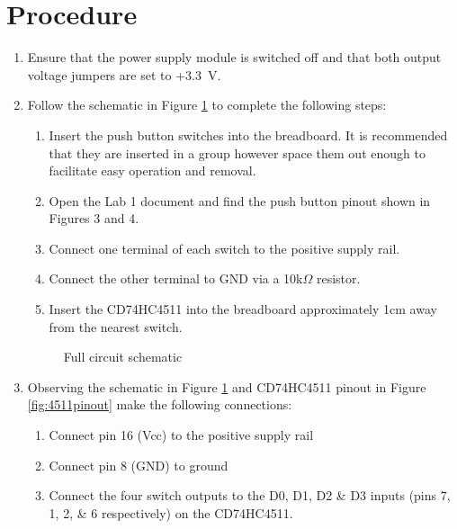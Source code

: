 \documentclass{UoNMCHA}
\numberwithin{equation}{section}
\begin{document}
\section{Procedure}
\begin{enumerate}
    \item Ensure that the power supply module is switched off and that both output voltage jumpers are set to +3.3~V.
    \item Follow the schematic in Figure \ref{fig:schematic} to complete the following steps:
    \begin{enumerate}
        \item Insert the push button switches into the breadboard. It is recommended that they are inserted in a group however space them out enough to facilitate easy operation and removal.
        \item Open the Lab 1 document and find the push button pinout shown in Figures 3 and 4.
        \item Connect one terminal of each switch to the positive supply rail.
        \item Connect the other terminal to GND via a 10k$\Omega$ resistor.
        \item Insert the CD74HC4511 into the breadboard approximately 1cm away from the nearest switch.
    \end{enumerate}
\begin{figure}[H]
\caption{Full circuit schematic}
\label{fig:schematic}
\end{figure}
    \item Observing the schematic in Figure \ref{fig:schematic} and CD74HC4511 pinout in Figure \ref{fig:4511pinout} make the following connections:
    \begin{enumerate}
        \item Connect pin 16 (Vcc) to the positive supply rail
        \item Connect pin 8 (GND) to ground
        \item Connect the four switch outputs to the D0, D1, D2 \& D3 inputs (pins 7, 1, 2, \& 6 respectively) on the CD74HC4511.

\end{enumerate}
\end{enumerate}
\end{document}
